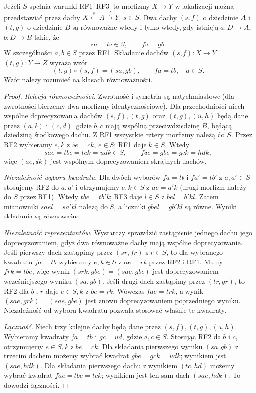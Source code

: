 \begin{twierdzenie}\label{cat:thm:roof-localization}
Jeżeli $S$ spełnia warunki RF1--RF3, to morfizmy $X\to Y$ w lokalizacji można przedstawiać przez dachy $X\xleftarrow{s}A\xrightarrow f Y$, $s\in S$. Dwa dachy $(s,f)$ o dziedzinie $A$ i $(t,g)$ o dziedzinie $B$ są równoważne wtedy i tylko wtedy, gdy istnieją $a:D\to A$, $b:D\to B$ takie, że
\[
 sa=tb\in S,\qquad fa=gb.
\]
W szczególności $a,b\in S$ przez RF1. Składanie dachów $(s,f):X\to Y$ i $(t,g):Y\to Z$ wyraża wzór
\begin{equation}\label{cat:eq:roof-composition}
 (t,g)\circ(s,f)=(sa,gb),\qquad fa=tb,\quad a\in S.
\end{equation}
Wzór należy rozumieć na klasach równoważności.
\end{twierdzenie}
\begin{proof}
\emph{Relacja równoważności.} Zwrotność i symetria są natychmiastowe (dla zwrotności bierzemy dwa morfizmy identycznościowe). Dla przechodniości niech wspólne doprecyzowania dachów $(s,f),(t,g)$ oraz $(t,g),(u,h)$ będą dane przez $(a,b)$ i $(c,d)$, gdzie $b,c$ mają wspólną przeciwdziedzinę $B$, będącą dziedziną środkowego dachu. Z RF1 wszystkie cztery morfizmy należą do $S$. Przez RF2 wybieramy $e,k$ z $be=ck$, $e\in S$; RF1 daje $k\in S$. Wtedy
\[
 sae=tbe=tck=udk\in S,\qquad
 fae=gbe=gck=hdk,
\]
więc $(ae,dk)$ jest wspólnym doprecyzowaniem skrajnych dachów.

\emph{Niezależność wyboru kwadratu.} Dla dwóch wyborów $fa=tb$ i $fa'=tb'$ z $a,a'\in S$ stosujemy RF2 do $a,a'$ i otrzymujemy $e,k\in S$ z $ae=a'k$ (drugi morfizm należy do $S$ przez RF1). Wtedy $tbe=tb'k$; RF3 daje $l\in S$ z $bel=b'kl$. Zatem mianowniki $sael=sa'kl$ należą do $S$, a liczniki $gbel=gb'kl$ są równe. Wyniki składania są równoważne.

\emph{Niezależność reprezentantów.} Wystarczy sprawdzić zastąpienie jednego dachu jego doprecyzowaniem, gdyż dwa równoważne dachy mają wspólne doprecyzowanie. Jeśli pierwszy dach zastąpimy przez $(sr,fr)$ z $r\in S$, to dla wybranego kwadratu $fa=tb$ wybieramy $e,k\in S$ z $ae=rk$ przez RF2 i RF1. Mamy $frk=tbe$, więc wynik $(srk,gbe)=(sae,gbe)$ jest doprecyzowaniem wcześniejszego wyniku $(sa,gb)$. Jeśli drugi dach zastąpimy przez $(tr,gr)$, to RF2 dla $b$ i $r$ daje $e\in S,k$ z $be=rk$. Wówczas $fae=tr k$, a wynik $(sae,grk)=(sae,gbe)$ jest znowu doprecyzowaniem poprzedniego wyniku. Niezależność od wyboru kwadratu pozwala stosować właśnie te kwadraty.

\emph{Łączność.} Niech trzy kolejne dachy będą dane przez $(s,f),(t,g),(u,h)$. Wybieramy kwadraty $fa=tb$ i $gc=ud$, gdzie $a,c\in S$. Stosując RF2 do $b$ i $c$, otrzymujemy $e\in S,k$ z $be=ck$. Dla składania pierwszego wyniku $(sa,gb)$ z trzecim dachem możemy wybrać kwadrat $gbe=gck=udk$; wynikiem jest $(sae,hdk)$. Dla składania pierwszego dachu z wynikiem $(tc,hd)$ możemy wybrać kwadrat $fae=tbe=tck$; wynikiem jest ten sam dach $(sae,hdk)$. To dowodzi łączności.


\end{proof}

